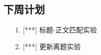 \documentclass[11pt]{article}
\begin{document}
\begin{CJK}{UTF8}{gkai}
\section{下周计划}
\begin{itemize}
\item [1.] [***] 标题-正文匹配实验
\item [2.] [***] 更新离题实验
\end{itemize}
%
%
%

\end{CJK}
\end{document}
